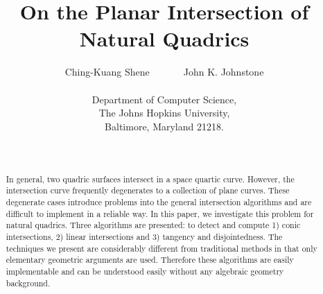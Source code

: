 \addtolength{\oddsidemargin}{-6mm}
\addtolength{\topmargin}{-1cm}

\def\thefootnote{\fnsymbol{footnote}}        %

\title{\bf On the Planar Intersection of Natural Quadrics\footnotemark[1]}

\author{Ching-Kuang Shene\ \ \ \ \ \ \ John K. Johnstone\\ \\
        Department of Computer Science, \\
        The Johns Hopkins University,   \\
        Baltimore, Maryland 21218.}

\date{\ }

\pagestyle{empty}



\maketitle



\def\thefootnote{\arabic{footnote}} %
\setcounter{footnote}{0}            %


\begin{abstract}
     In general, two quadric surfaces intersect in a space quartic curve.
However, the intersection curve frequently degenerates to  a collection of 
plane curves.  These degenerate cases
introduce problems into the general intersection algorithms and are difficult 
to implement in a reliable way.  In this paper, we investigate this problem 
for natural quadrics.  Three algorithms are presented: to detect and compute
1) conic intersections,
2) linear intersections and 3) tangency and disjointedness.
The techniques we present are considerably
different from traditional methods in that only elementary geometric arguments
are used.  Therefore these algorithms are easily implementable and can be 
understood easily without any algebraic geometry background.
\end{abstract}

